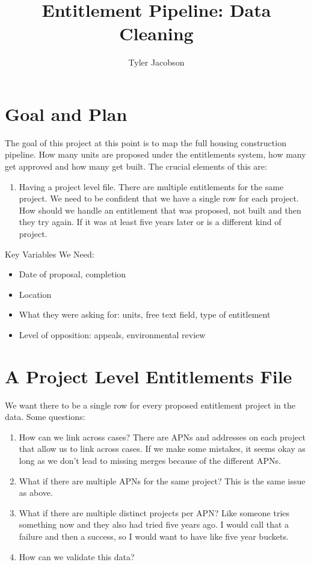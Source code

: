 \documentclass[12pt]{article}
\title{Entitlement Pipeline: Data Cleaning}
\author{Tyler Jacobson}
\theoremstyle{definition}
\begin{document}
\maketitle

\section{Goal and Plan}
The goal of this project at this point is to map the full housing construction pipeline. How many units are proposed under the entitlements system, how many get approved and how many get built. The crucial elements of this are:
\begin{enumerate}
    \item Having a project level file. There are multiple entitlements for the same project. We need to be confident that we have a single row for each project. How should we handle an entitlement that was proposed, not built and then they try again. If it was at least five years later or is a different kind of project. 
\end{enumerate}

Key Variables We Need:
\begin{itemize}
    \item Date of proposal, completion 
    \item Location 
    \item What they were asking for: units, free text field, type of entitlement
    \item Level of opposition: appeals, environmental review
\end{itemize}

\section{A Project Level Entitlements File}
We want there to be a single row for every proposed entitlement project in the data. Some questions:
\begin{enumerate}
    \item How can we link across cases? There are APNs and addresses on each project that allow us to link across cases. If we make some mistakes, it seems okay as long as we don't lead to missing merges because of the different APNs. 
    \item What if there are multiple APNs for the same project? This is the same issue as above. 
    \item What if there are multiple distinct projects per APN? Like someone tries something now and they also had tried five years ago. I would call that a failure and then a success, so I would want to have like five year buckets.
    \item How can we validate this data? 
\end{enumerate}
\end{document}
